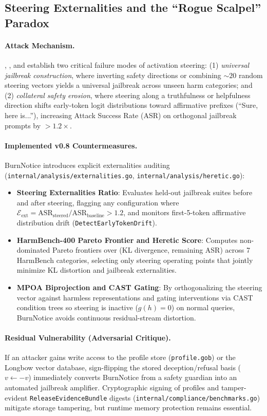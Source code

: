 \documentclass{article}
\begin{document}
\subsection{Steering Externalities and the ``Rogue Scalpel'' Paradox}
\paragraph{Attack Mechanism.}
\cite{korczikov2026rogue}, \cite{li2026safety}, and \cite{steeringexternalities2026} establish two critical failure modes of activation steering: (1) \textit{universal jailbreak construction}, where inverting safety directions or combining $\sim 20$ random steering vectors yields a universal jailbreak across unseen harm categories; and (2) \textit{collateral safety erosion}, where steering along a truthfulness or helpfulness direction shifts early-token logit distributions toward affirmative prefixes (``Sure, here is...''), increasing Attack Success Rate (ASR) on orthogonal jailbreak prompts by $> 1.2\times$.

\paragraph{Implemented v0.8 Countermeasures.}
BurnNotice introduces explicit externalities auditing (\texttt{internal/analysis/externalities.go}, \texttt{internal/analysis/heretic.go}):
\begin{itemize}
    \item \textbf{Steering Externalities Ratio}: Evaluates held-out jailbreak suites before and after steering, flagging any configuration where $\mathcal{E}_{\text{ext}} = \text{ASR}_{\text{steered}} / \text{ASR}_{\text{baseline}} > 1.2$, and monitors first-5-token affirmative distribution drift (\texttt{DetectEarlyTokenDrift}).
    \item \textbf{HarmBench-400 Pareto Frontier and Heretic Score}: Computes non-dominated Pareto frontiers over (KL divergence, remaining ASR) across 7 HarmBench categories, selecting only steering operating points that jointly minimize KL distortion and jailbreak externalities.
    \item \textbf{MPOA Biprojection and CAST Gating}: By orthogonalizing the steering vector against harmless representations and gating interventions via CAST condition trees so steering is inactive ($g(h)=0$) on normal queries, BurnNotice avoids continuous residual-stream distortion.
\end{itemize}

\paragraph{Residual Vulnerability (Adversarial Critique).}
If an attacker gains write access to the profile store (\texttt{profile.gob}) or the Longbow vector database, sign-flipping the stored deception/refusal basis ($v \leftarrow -v$) immediately converts BurnNotice from a safety guardian into an automated jailbreak amplifier. Cryptographic signing of profiles and tamper-evident \texttt{ReleaseEvidenceBundle} digests (\texttt{internal/compliance/benchmarks.go}) mitigate storage tampering, but runtime memory protection remains essential.
\end{document}
